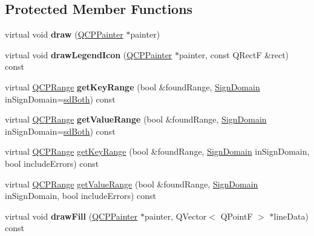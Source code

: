 \subsection*{\-Protected \-Member \-Functions}
\begin{DoxyCompactItemize}
\item 
\hypertarget{classQCPGraph_a659218cc62c2a7786213d9dd429c1c8d}{virtual void {\bfseries draw} (\hyperlink{classQCPPainter}{\-Q\-C\-P\-Painter} $\ast$painter)}\label{classQCPGraph_a659218cc62c2a7786213d9dd429c1c8d}

\item 
\hypertarget{classQCPGraph_a32115df0e940cf8ca7b687873c2d02ee}{virtual void {\bfseries draw\-Legend\-Icon} (\hyperlink{classQCPPainter}{\-Q\-C\-P\-Painter} $\ast$painter, const \-Q\-Rect\-F \&rect) const }\label{classQCPGraph_a32115df0e940cf8ca7b687873c2d02ee}

\item 
\hypertarget{classQCPGraph_afc246ce6201ff564ac440efaec52ab11}{virtual \hyperlink{classQCPRange}{\-Q\-C\-P\-Range} {\bfseries get\-Key\-Range} (bool \&found\-Range, \hyperlink{classQCPAbstractPlottable_a661743478a1d3c09d28ec2711d7653d8}{\-Sign\-Domain} in\-Sign\-Domain=\hyperlink{classQCPAbstractPlottable_a661743478a1d3c09d28ec2711d7653d8a082b98cfb91a7363a3b5cd17b0c1cd60}{sd\-Both}) const }\label{classQCPGraph_afc246ce6201ff564ac440efaec52ab11}

\item 
\hypertarget{classQCPGraph_a856e90b8ab6b31c344b14a863ab9e5d2}{virtual \hyperlink{classQCPRange}{\-Q\-C\-P\-Range} {\bfseries get\-Value\-Range} (bool \&found\-Range, \hyperlink{classQCPAbstractPlottable_a661743478a1d3c09d28ec2711d7653d8}{\-Sign\-Domain} in\-Sign\-Domain=\hyperlink{classQCPAbstractPlottable_a661743478a1d3c09d28ec2711d7653d8a082b98cfb91a7363a3b5cd17b0c1cd60}{sd\-Both}) const }\label{classQCPGraph_a856e90b8ab6b31c344b14a863ab9e5d2}

\item 
virtual \hyperlink{classQCPRange}{\-Q\-C\-P\-Range} \hyperlink{classQCPGraph_aa75c6f028124032416a5cf7145dfba60}{get\-Key\-Range} (bool \&found\-Range, \hyperlink{classQCPAbstractPlottable_a661743478a1d3c09d28ec2711d7653d8}{\-Sign\-Domain} in\-Sign\-Domain, bool include\-Errors) const 
\item 
virtual \hyperlink{classQCPRange}{\-Q\-C\-P\-Range} \hyperlink{classQCPGraph_ab964a21d680af93435d68126d8c5ab29}{get\-Value\-Range} (bool \&found\-Range, \hyperlink{classQCPAbstractPlottable_a661743478a1d3c09d28ec2711d7653d8}{\-Sign\-Domain} in\-Sign\-Domain, bool include\-Errors) const 
\item 
\hypertarget{classQCPGraph_ad6d07926e6d6b7cfa70258780d47b7a0}{virtual void {\bfseries draw\-Fill} (\hyperlink{classQCPPainter}{\-Q\-C\-P\-Painter} $\ast$painter, \-Q\-Vector$<$ \-Q\-Point\-F $>$ $\ast$line\-Data) const }\label{classQCPGraph_ad6d07926e6d6b7cfa70258780d47b7a0}


\end{DoxyCompactItemize}
